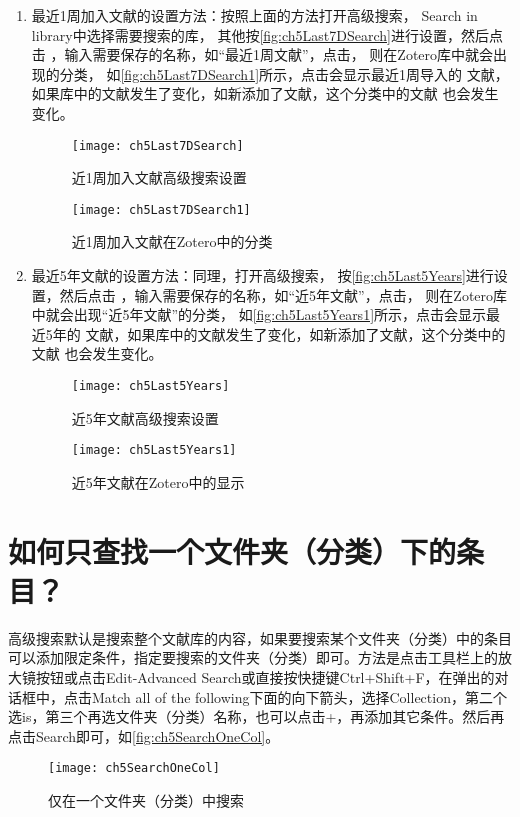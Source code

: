 \documentclass[theorem=false,mathfont=none,openany,sub3section]{easybook}
\begin{document}
{\begin{enumerate}
	
	\begin{figure}[ht]
		\centering
		\texttt{[image: ch5ToolbarSearch]}
		\caption{高级搜索对话框2}
		\label{fig:ch5ToolbarSearch}
	\end{figure}
	\item 最近1周加入文献的设置方法：按照上面的方法打开高级搜索，
	Search in library中选择需要搜索的库，
	其他按\autoref{fig:ch5Last7DSearch}进行设置，然后点击
	，输入需要保存的名称，如“最近1周文献”，点击，
	则在Zotero库中就会出现的分类，
	如\autoref{fig:ch5Last7DSearch1}所示，点击会显示最近1周导入的
	文献，如果库中的文献发生了变化，如新添加了文献，这个分类中的文献
	也会发生变化。
	\begin{figure}[ht]
		\centering
		\texttt{[image: ch5Last7DSearch]}
		\caption{近1周加入文献高级搜索设置}
		\label{fig:ch5Last7DSearch}
	\end{figure}	
	
	\begin{figure}[ht]
		\centering
		\texttt{[image: ch5Last7DSearch1]}
		\caption{近1周加入文献在Zotero中的分类}
		\label{fig:ch5Last7DSearch1}
	\end{figure}	
	
	\item 最近5年文献的设置方法：同理，打开高级搜索，
	按\autoref{fig:ch5Last5Years}进行设置，然后点击
	，输入需要保存的名称，如“近5年文献”，点击，
	则在Zotero库中就会出现“近5年文献”的分类，
	如\autoref{fig:ch5Last5Years1}所示，点击会显示最近5年的
	文献，如果库中的文献发生了变化，如新添加了文献，这个分类中的文献
	也会发生变化。
	\begin{figure}[ht]
		\centering
		\texttt{[image: ch5Last5Years]}
		\caption{近5年文献高级搜索设置}
		\label{fig:ch5Last5Years}
	\end{figure}
	\begin{figure}[ht]
		\centering
		\texttt{[image: ch5Last5Years1]}
		\caption{近5年文献在Zotero中的显示}
		\label{fig:ch5Last5Years1}
	\end{figure}		
\end{enumerate}

\section{如何只查找一个文件夹（分类）下的条目？}\label{sec:SearchOneCollection}
高级搜索默认是搜索整个文献库的内容，如果要搜索某个文件夹（分类）中的条目可以添加限定条件，指定要搜索的文件夹（分类）即可。方法是点击工具栏上的放大镜按钮或点击Edit-Advanced Search或直接按快捷键Ctrl+Shift+F，在弹出的对话框中，点击Match all of the following下面的向下箭头，选择Collection，第二个选is，第三个再选文件夹（分类）名称，也可以点击+，再添加其它条件。然后再点击Search即可，如\autoref{fig:ch5SearchOneCol}。
	\begin{figure}[ht]
		\centering
		\texttt{[image: ch5SearchOneCol]}
		\caption{仅在一个文件夹（分类）中搜索}
		\label{fig:ch5SearchOneCol}
	\end{figure}
}
\end{document}

